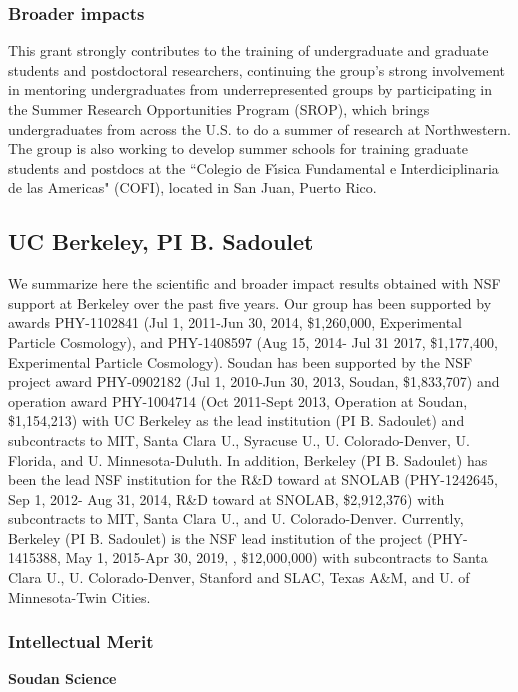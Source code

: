 \subsubsection{Broader impacts}
This grant strongly contributes to the training of undergraduate and graduate students and postdoctoral researchers, continuing the group's strong involvement in mentoring undergraduates from underrepresented groups by participating in the Summer Research Opportunities Program (SROP), which brings undergraduates from across the U.S. to do a summer of research at Northwestern. The group is also working to develop summer schools for training graduate students and postdocs at the ``Colegio de F\'{\i}sica Fundamental e Interdiciplinaria de las Americas" (COFI), located in San Juan, Puerto Rico.

\subsection{UC Berkeley, PI B. Sadoulet}

We summarize here the scientific and broader impact results obtained with NSF support at Berkeley over the past five years. Our group has been supported by awards PHY-1102841 (Jul 1, 2011-Jun 30, 2014, \$1,260,000, Experimental Particle Cosmology), and  PHY-1408597 (Aug 15, 2014- Jul 31 2017, \$1,177,400, Experimental Particle Cosmology). \SuperCDMS Soudan has been supported  by the NSF project award PHY-0902182 (Jul 1, 2010-Jun 30, 2013, \SuperCDMS Soudan, \$1,833,707) and operation award PHY-1004714 (Oct 2011-Sept 2013, \SuperCDMS Operation at Soudan, \$1,154,213) with UC Berkeley as the lead institution (PI B. Sadoulet) and subcontracts to MIT,  Santa Clara U., Syracuse U., U. Colorado-Denver, U. Florida, and U. Minnesota-Duluth. In addition, Berkeley (PI B. Sadoulet) has been the lead  NSF institution for the R\&D toward \SuperCDMS at SNOLAB (PHY-1242645, Sep 1, 2012- Aug 31, 2014, R\&D toward \SuperCDMS at SNOLAB, \$2,912,376) with subcontracts to MIT, Santa Clara U., and U. Colorado-Denver. Currently, Berkeley (PI B. Sadoulet) is the NSF lead institution of the \scs project (PHY-1415388, May 1, 2015-Apr 30, 2019, \scs, \$12,000,000) with subcontracts to Santa Clara U., U. Colorado-Denver, Stanford and SLAC, Texas A\&M, and U. of Minnesota-Twin Cities.

\subsubsection{Intellectual Merit}
\textbf{\SuperCDMS Soudan Science}

